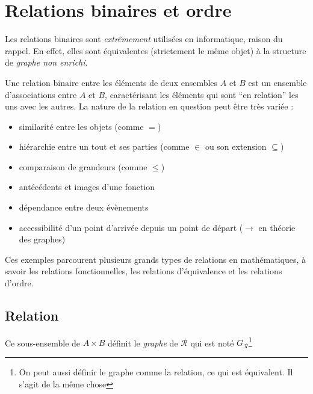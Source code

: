 \documentclass[../../main.tex]{subfiles}
\begin{document}
\section{Relations binaires et ordre}
\label{sec:relations_binaires_et_ordre}
Les relations binaires sont \textit{extrêmement} utilisées en informatique, raison du rappel. En effet, elles sont équivalentes (strictement le même objet) à la structure de \textit{graphe non enrichi}.

Une relation binaire entre les éléments de deux ensembles $A$ et $B$ est un ensemble d'associations entre $A$ et $B$, caractérisant les éléments qui sont ``en relation'' les uns avec les autres. La nature de la relation en question peut être très variée :
\begin{itemize}
	\item similarité entre les objets (comme $=$)
	\item hiérarchie entre un tout et ses parties (comme $\in$ ou son extension $\subseteq$)
	\item comparaison de grandeurs (comme $\leq$)
	\item antécédents et images d'une fonction
	\item dépendance entre deux évènements
	\item accessibilité d'un point d'arrivée depuis un point de départ ($\rightarrow$ en théorie des graphes)
\end{itemize}
Ces exemples parcourent plusieurs grands types de relations en mathématiques, à savoir les relations fonctionnelles, les relations d'équivalence et les relations d'ordre.

\subsection{Relation}
Ce sous-ensemble de $A\times B$ définit le \textit{graphe} de $\mathcal{R}$ qui est noté $G_{\mathcal{R}}$\footnote{On peut aussi définir le graphe comme la relation, ce qui est équivalent. Il s'agit de la même chose}
\end{document}
